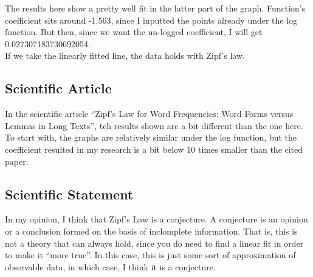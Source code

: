 \documentclass[english]{report}
\begin{document}
The results here show a pretty well fit in the latter part of the graph. Function's coefficient sits around -1.563, since I inputted the points already under the log function. But then, since we want the un-logged coefficient, I will get 0.027307183730692054.
\\
If we take the linearly fitted line, the data holds with Zipf's law.

\subsection{Scientific Article}

In the scientific article ``Zipf’s Law for Word Frequencies: Word Forms versus Lemmas in Long Texts'', teh results shown are a bit different than the one here.\\
To start with, the graphs are relatively similar under the log function, but the coefficient resulted in my research is a bit below 10 times smaller than the cited paper. \cite{zipf}

\subsection{Scientific Statement}

In my opinion, I think that Zipf's Law is a conjecture. A conjecture is an opinion or a conclusion formed on the basis of inclomplete information. That is, this is not a theory that can always hold, since you do need to find a linear fit in order to make it ``more true''. In this case, this is just some sort of approximation of observable data, in which case, I think it is a conjecture.


\renewcommand{\bibname}{References}

\end{document}
